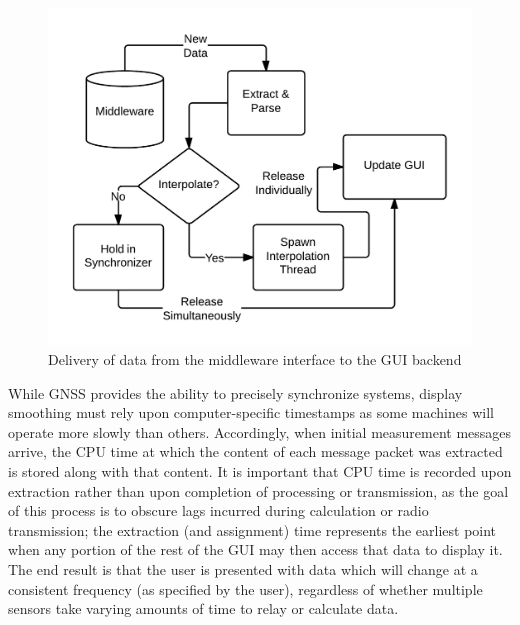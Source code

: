 \documentclass[twocolumn,10pt]{article}
\begin{document}
    \begin{figure}[ht] \centering
      \includegraphics[width=\columnwidth]{../graphics/middleware_diagram.png}
      \caption{Delivery of data from the middleware interface to the GUI backend}
      \label{fig:middlewared}
    \end{figure}

    While GNSS provides the ability to precisely synchronize systems, display smoothing must rely upon computer-specific timestamps as some machines will operate more slowly than others. Accordingly, when initial measurement messages arrive, the CPU time at which the content of each message packet was extracted is stored along with that content. It is important that CPU time is recorded upon extraction rather than upon completion of processing or transmission, as the goal of this process is to obscure lags incurred during calculation or radio transmission; the extraction (and assignment) time represents the earliest point when any portion of the rest of the GUI may then access that data to display it. The end result is that the user is presented with data which will change at a consistent frequency (as specified by the user), regardless of whether multiple sensors take varying amounts of time to relay or calculate data.

\end{document}
